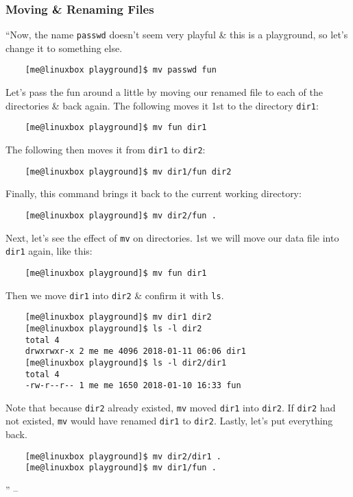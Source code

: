 \documentclass[oneside]{book}
\numberwithin{equation}{section}
\begin{document}
\subsubsection{Moving \& Renaming Files}
``Now, the name \texttt{passwd} doesn't seem very playful \& this is a playground, so let's change it to something else.
\begin{verbatim}
	[me@linuxbox playground]$ mv passwd fun
\end{verbatim}
Let's pass the fun around a little by moving our renamed file to each of the directories \& back again. The following moves it 1st to the directory \texttt{dir1}:
\begin{verbatim}
	[me@linuxbox playground]$ mv fun dir1
\end{verbatim}
The following then moves it from \texttt{dir1} to \texttt{dir2}:
\begin{verbatim}
	[me@linuxbox playground]$ mv dir1/fun dir2
\end{verbatim}
Finally, this command brings it back to the current working directory:
\begin{verbatim}
	[me@linuxbox playground]$ mv dir2/fun .
\end{verbatim}
Next, let's see the effect of \texttt{mv} on directories. 1st we will move our data file into \texttt{dir1} again, like this:
\begin{verbatim}
	[me@linuxbox playground]$ mv fun dir1
\end{verbatim}
Then we move \texttt{dir1} into \texttt{dir2} \& confirm it with \texttt{ls}.
\begin{verbatim}
	[me@linuxbox playground]$ mv dir1 dir2
	[me@linuxbox playground]$ ls -l dir2
	total 4
	drwxrwxr-x 2 me me 4096 2018-01-11 06:06 dir1
	[me@linuxbox playground]$ ls -l dir2/dir1
	total 4
	-rw-r--r-- 1 me me 1650 2018-01-10 16:33 fun
\end{verbatim}
Note that because \texttt{dir2} already existed, \texttt{mv} moved \texttt{dir1} into \texttt{dir2}. If \texttt{dir2} had not existed, \texttt{mv} would have renamed \texttt{dir1} to \texttt{dir2}. Lastly, let's put everything back.
\begin{verbatim}
	[me@linuxbox playground]$ mv dir2/dir1 .
	[me@linuxbox playground]$ mv dir1/fun .
\end{verbatim}
'' -- \cite[pp. 76--77]{Shotts2019}
\end{document}
